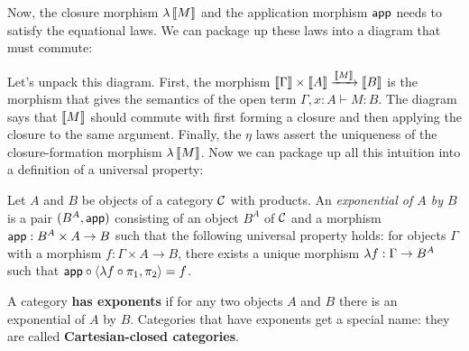 Now, the closure morphism $\lambda \left\llbracket M \right\rrbracket$ 
and the application morphism $\mathsf{app}$ needs to satisfy the equational 
laws. We can package up these laws into a diagram that must commute:

\begin{center}
\end{center}

Let's unpack this diagram. First, the morphism $\left\llbracket \Gamma \right\rrbracket \times
\left\llbracket A \right\rrbracket \xrightarrow{\left\llbracket M \right\rrbracket} \left\llbracket B \right\rrbracket$ is the morphism that  gives 
the semantics of the open term $\Gamma, x : A \vdash M : B$. 
The diagram says that $\left\llbracket M \right\rrbracket$ should commute with first forming a 
closure and then applying the closure to the same argument.
Finally, the $\eta$ laws assert the uniqueness of the closure-formation 
morphism $\lambda \left\llbracket M \right\rrbracket$. Now we can package up all this intuition 
into a definition of a universal property:

\begin{definition} \label{def:exponential}
  Let \(A\) and \(B\) be objects of a category \(\mathcal C\) with products.
  An \emph{exponential of \(A\) by \(B\)}
  is a pair \((B^A,\mathsf{app})\) consisting of
  an object \(B^A\) of \(\mathcal C\)
  and a morphism
  \(\mathsf{app} : B^A \times A \to B\)
  such that the following universal property holds:
  for objects $\Gamma$ with a morphism \(f : \Gamma \times A \to B\),
  there exists a unique morphism \(\lambda f : \Gamma \to B^A\)
  such that \(\mathsf{app} \circ \langle \lambda f \circ \pi_1, \pi_2\rangle = f\).
\end{definition}

A category \textbf{has exponents} if for any two objects $A$ and 
$B$ there is an exponential of $A$ by $B$.
Categories that have exponents get a special name: they are called
\textbf{Cartesian-closed categories}. 

